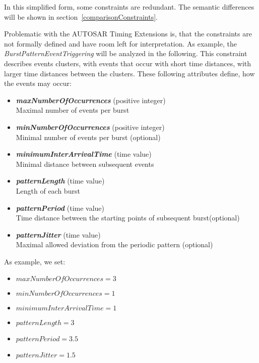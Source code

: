 	In this simplified form, some constraints are redundant. The semantic differences will be shown in section~\ref{comparisonConstraints}.

	Problematic with the AUTOSAR Timing Extensions is, that the constraints are not formally defined and have room left for interpretation. As example, the \emph{BurstPatternEventTriggering} will be analyzed in the following. This constraint describes events clusters, with events that occur with short time distances, with larger time distances between the clusters. These following attributes define, how the events may occur:
	\begin{itemize}
		\item
			\textbf{\emph{maxNumberOfOccurrences}} (positive integer)\\
			Maximal number of events per burst
		\item
			\textbf{\emph{minNumberOfOccurrences}} (positive integer)\\
			Minimal number of events per burst (optional)
		\item
			\textbf{\emph{minimumInterArrivalTime}} (time value)\\
			Minimal distance between subsequent events
		\item
			\textbf{\emph{patternLength}} (time value)\\
			Length of each burst
		\item
			\textbf{\emph{patternPeriod}} (time value)\\
			Time distance between the starting points of subsequent burst(optional)
		\item
			\textbf{\emph{patternJitter}} (time value)\\
			Maximal allowed deviation from the periodic pattern	(optional)
	\end{itemize}

As example, we set:
\begin{itemize}
	\item
	$maxNumberOfOccurrences = 3$
	\item
	$minNumberOfOccurrences = 1$
	\item
	$minimumInterArrivalTime = 1$
	\item
	$patternLength = 3$
	\item
	$patternPeriod = 3.5$
	\item
	$patternJitter = 1.5$
\end{itemize}

